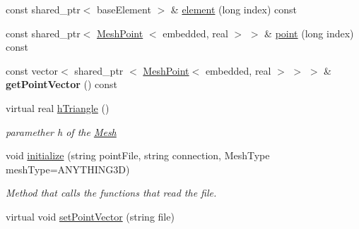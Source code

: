 \begin{DoxyCompactItemize}
\item 
const shared\-\_\-ptr$<$ base\-Element $>$ \& \hyperlink{class_mesh_a4a1745c0291384760349262dca8ca27c}{element} (long index) const 
\item 
const shared\-\_\-ptr$<$ \hyperlink{class_mesh_point}{\-Mesh\-Point}\*
$<$ embedded, real $>$ $>$ \& \hyperlink{class_mesh_a41e57256500b30c8a79e32ce070ff2d1}{point} (long index) const 
\item 
\hypertarget{class_mesh_ae589a7d04810b2ca182ce577c9976400}{const vector$<$ shared\-\_\-ptr\*
$<$ \hyperlink{class_mesh_point}{\-Mesh\-Point}$<$ embedded, real $>$ $>$ $>$ \& {\bfseries get\-Point\-Vector} () const }\label{class_mesh_ae589a7d04810b2ca182ce577c9976400}

\item 
\hypertarget{class_mesh_a828737450d4876e720c518ef362fa52a}{virtual real \hyperlink{class_mesh_a828737450d4876e720c518ef362fa52a}{h\-Triangle} ()}\label{class_mesh_a828737450d4876e720c518ef362fa52a}

\begin{DoxyCompactList}\small\item\em paramether h of the \hyperlink{class_mesh}{\-Mesh} \end{DoxyCompactList}\item 
void \hyperlink{class_mesh_adbdd6ff691886a2a8e9ec8192c9b0469}{initialize} (string point\-File, string connection, \-Mesh\-Type mesh\-Type=\-A\-N\-Y\-T\-H\-I\-N\-G3\-D)
\begin{DoxyCompactList}\small\item\em \-Method that calls the functions that read the file. \end{DoxyCompactList}\item 
\hypertarget{class_mesh_abb728c88ecb80918cdcc0408eb5cb0c6}{virtual void \hyperlink{class_mesh_abb728c88ecb80918cdcc0408eb5cb0c6}{set\-Point\-Vector} (string file)}\label{class_mesh_abb728c88ecb80918cdcc0408eb5cb0c6}


\end{DoxyCompactItemize}
